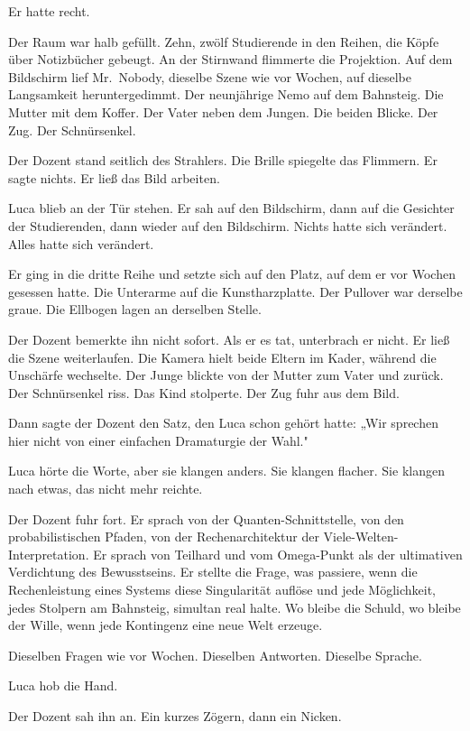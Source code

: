 \documentclass[
  ngerman,
]{article}
\begin{document}
Er hatte recht.

Der Raum war halb gefüllt. Zehn, zwölf Studierende in den Reihen, die
Köpfe über Notizbücher gebeugt. An der Stirnwand flimmerte die
Projektion. Auf dem Bildschirm lief Mr.~Nobody, dieselbe Szene wie vor
Wochen, auf dieselbe Langsamkeit heruntergedimmt. Der neunjährige Nemo
auf dem Bahnsteig. Die Mutter mit dem Koffer. Der Vater neben dem
Jungen. Die beiden Blicke. Der Zug. Der Schnürsenkel.

Der Dozent stand seitlich des Strahlers. Die Brille spiegelte das
Flimmern. Er sagte nichts. Er ließ das Bild arbeiten.

Luca blieb an der Tür stehen. Er sah auf den Bildschirm, dann auf die
Gesichter der Studierenden, dann wieder auf den Bildschirm. Nichts hatte
sich verändert. Alles hatte sich verändert.

Er ging in die dritte Reihe und setzte sich auf den Platz, auf dem er
vor Wochen gesessen hatte. Die Unterarme auf die Kunstharzplatte. Der
Pullover war derselbe graue. Die Ellbogen lagen an derselben Stelle.

Der Dozent bemerkte ihn nicht sofort. Als er es tat, unterbrach er
nicht. Er ließ die Szene weiterlaufen. Die Kamera hielt beide Eltern im
Kader, während die Unschärfe wechselte. Der Junge blickte von der Mutter
zum Vater und zurück. Der Schnürsenkel riss. Das Kind stolperte. Der Zug
fuhr aus dem Bild.

Dann sagte der Dozent den Satz, den Luca schon gehört hatte: „Wir
sprechen hier nicht von einer einfachen Dramaturgie der Wahl."

Luca hörte die Worte, aber sie klangen anders. Sie klangen flacher. Sie
klangen nach etwas, das nicht mehr reichte.

Der Dozent fuhr fort. Er sprach von der Quanten-Schnittstelle, von den
probabilistischen Pfaden, von der Rechenarchitektur der
Viele-Welten-Interpretation. Er sprach von Teilhard und vom Omega-Punkt
als der ultimativen Verdichtung des Bewusstseins. Er stellte die Frage,
was passiere, wenn die Rechenleistung eines Systems diese Singularität
auflöse und jede Möglichkeit, jedes Stolpern am Bahnsteig, simultan real
halte. Wo bleibe die Schuld, wo bleibe der Wille, wenn jede Kontingenz
eine neue Welt erzeuge.

Dieselben Fragen wie vor Wochen. Dieselben Antworten. Dieselbe Sprache.

Luca hob die Hand.

Der Dozent sah ihn an. Ein kurzes Zögern, dann ein Nicken.
\end{document}
